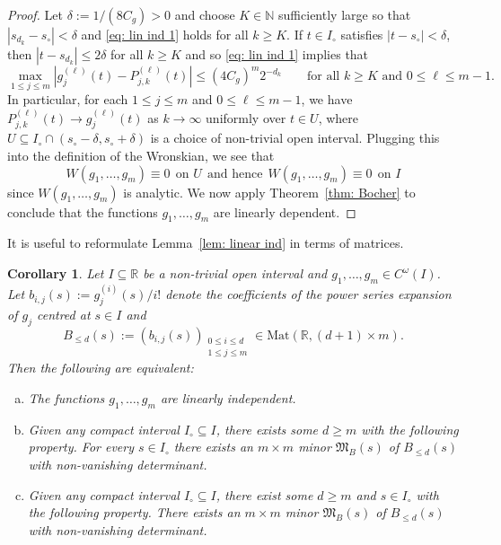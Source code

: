 \documentclass[reqno]{amsart}
\numberwithin{equation}{section}
\newcommand{\N}{\mathbb{N}}
\newcommand{\R}{\mathbb{R}}
\newcommand{\fM}{\mathfrak{M}}
\theoremstyle{plain}
\newtheorem{corollary}[theorem]{Corollary}
\theoremstyle{definition}
\begin{document}
\begin{proof}
Let $\delta := 1/(8C_g) > 0$ and choose $K \in \N$ sufficiently large so that $|s_{d_k} - s_{\circ}| < \delta$ and \eqref{eq: lin ind 1} holds for all $k \geq K$. If $t \in I_{\circ}$ satisfies $|t - s_{\circ}| < \delta$, then $|t - s_{d_k}| \leq 2\delta$ for all $k \geq K$ and so \eqref{eq: lin ind 1} implies that
\begin{equation*}
  \max_{1 \leq j \leq m} |g_j^{(\ell)}(t) - P_{j,k}^{(\ell)}(t)| \leq (4C_g)^m 2^{-d_k}    \qquad \textrm{for all $k \geq K$ and $0 \leq \ell \leq m-1$.}
\end{equation*}
In particular, for each $1 \leq j \leq m$ and $0 \leq \ell \leq m-1$, we have $P_{j,k}^{(\ell)}(t) \to g_j^{(\ell)}(t)$ as $k \to \infty$ uniformly over $t \in U$, where $U \subseteq I_{\circ} \cap (s_{\circ}-\delta, s_{\circ}+\delta)$ is a choice of non-trivial open interval. Plugging this into the definition of the Wronskian, we see that
\begin{equation*}
    W(g_1, \dots, g_m) \equiv 0 \ \ \textrm{on $U$} \ \ \textrm{and hence} \ \ W(g_1, \dots, g_m) \equiv 0 \ \ \textrm{on $I$}
\end{equation*}
since $W(g_1, \dots, g_m)$ is analytic.
We now apply Theorem~\ref{thm: Bocher} to conclude that the functions $g_1, \dots, g_m$ are linearly dependent.
\end{proof}

It is useful to reformulate Lemma~\ref{lem: linear ind} in terms of matrices.

\begin{corollary}\label{cor: linear ind} Let $I \subseteq \R$ be a non-trivial open interval and $g_1, \dots, g_m \in C^{\omega}(I)$. Let $b_{i,j}(s) := g_j^{(i)}(s)/i!$ denote the coefficients of the power series expansion of $g_j$ centred at $s \in I$ and 
    \begin{equation*}
        B_{\leq d}(s) := (b_{i,j}(s))_{\substack{0 \leq i \leq d \\ 1 \leq j \leq m}} \in \mathrm{Mat}(\R, (d+1) \times m).
    \end{equation*}
Then the following are equivalent:
\begin{enumerate}[a)]
    \item The functions $g_1,\dots, g_m$ are linearly independent.
    \item Given any compact interval $I_{\circ} \subseteq I$, there exists some $d \geq m$ with the following property. For every $s \in I_{\circ}$ there exists an $m \times m$ minor $\fM_B(s)$ of $B_{\leq d}(s)$ with non-vanishing determinant. 
    \item Given any compact interval $I_{\circ} \subseteq I$, there exist some $d \geq m$ and $s \in I_{\circ}$ with the following property. There exists an $m \times m$ minor $\fM_B(s)$ of $B_{\leq d}(s)$ with non-vanishing determinant.
\end{enumerate} 
\end{corollary}
\end{document}
